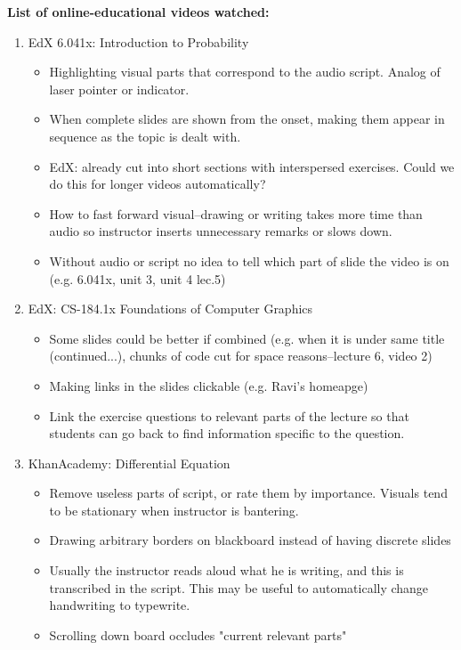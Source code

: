 \documentclass{report}
\begin{document}
\textbf{List of online-educational videos watched:}
\begin{enumerate}
\item EdX 6.041x: Introduction to Probability
\begin{itemize}
\item Highlighting visual parts that correspond to the audio script. Analog of laser pointer or indicator.
\item When complete slides are shown from the onset, making them appear in sequence as the topic is dealt with.
\item EdX: already cut into short sections with interspersed exercises. Could we do this for longer videos automatically?
\item How to fast forward visual--drawing or writing takes more time than audio so instructor inserts unnecessary remarks or slows down.
\item Without audio or script no idea to tell which part of slide the video is on (e.g. 6.041x, unit 3, unit 4 lec.5)
\end{itemize}

\item EdX: CS-184.1x Foundations of Computer Graphics
\begin{itemize}
\item Some slides could be better if combined (e.g. when it is under same title (continued...), chunks of code cut for space reasons--lecture 6, video 2)
\item Making links in the slides clickable (e.g. Ravi's homeapge)
\item Link the exercise questions to relevant parts of the lecture so that students can go back to find information specific to the question.
\end{itemize}

\item KhanAcademy: Differential Equation
\begin{itemize}
\item Remove useless parts of script, or rate them by importance. Visuals tend to be stationary when instructor is bantering.
\item Drawing arbitrary borders on blackboard instead of having discrete slides
\item Usually the instructor reads aloud what he is writing, and this is transcribed in the script. This may be useful to automatically change handwriting to typewrite.
\item Scrolling down board occludes "current relevant parts"
\end{itemize}


\end{enumerate}
\end{document}
